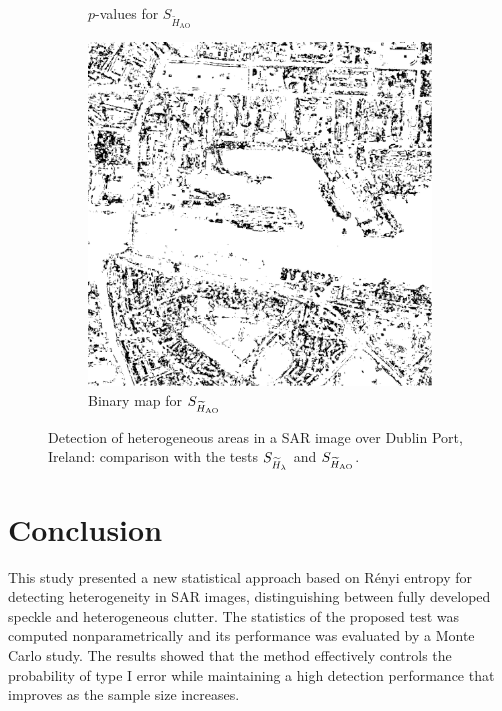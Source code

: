 \documentclass[
  journal,
]{IEEEtran}%
\begin{document}
\begin{figure}[hbt]
\begin{subfigure}{0.22\textwidth}
        \caption{$p$-values for $S_{\widetilde{H}_{\text{AO}}}$}
        \label{fig:3d}
    \end{subfigure}
    \begin{subfigure}{0.16\textwidth}
        \includegraphics[width=\linewidth]{./Figures/H_005_AO_w7_L16_b100.png}
        \caption{Binary map for $\small{S_{\widetilde{H}_{\text{AO}}}}$}
        \label{fig:3e}
    \end{subfigure}
   \caption{Detection of heterogeneous areas in a SAR image over Dublin Port, Ireland: comparison with the tests $\small{S_{\widetilde{H}_{\lambda}}}$ and $\small{S_{\widetilde{H}_{\text{AO}}}}$.}

    \label{fig:dublin}
\end{figure}

\section{Conclusion}\label{sec:conclusion}

This study presented a new statistical approach based on Rényi entropy
for detecting heterogeneity in SAR images, distinguishing between fully
developed speckle and heterogeneous clutter. The statistics of the
proposed test was computed nonparametrically and its performance was
evaluated by a Monte Carlo study. The results showed that the method
effectively controls the probability of type I error while maintaining a
high detection performance that improves as the sample size increases.
\end{document}
